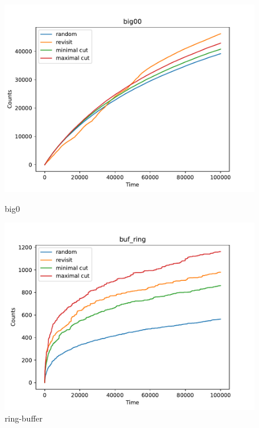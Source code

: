 \begin{figure}[h!]

	\centering
	\begin{minipage}{0.45\textwidth}
		\centering
		\includegraphics[width=\textwidth]{figure/genmc/big00.pdf}
		\caption{big0}
		\label{genmc:big0}
	\end{minipage}
	\hfill
	\begin{minipage}{0.45\textwidth}
		\centering
		\includegraphics[width=\textwidth]{figure/genmc/buf_ring.pdf}
		\caption{ring-buffer}
		\label{genmc:buf_ring}
	\end{minipage}

	\vspace{0.5cm}


\end{figure}
